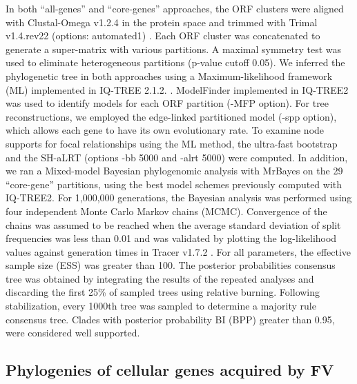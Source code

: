 In both “all-genes” and “core-genes” approaches, the ORF clusters were aligned with Clustal-Omega v1.2.4 \citep{sievers_fast_2011} in the protein space and trimmed with Trimal v1.4.rev22 (options: automated1) \citep{capella-gutierrez_trimal_2009}. Each ORF cluster was concatenated to generate a super-matrix with various partitions. A maximal symmetry test \citep{naser-khdour_prevalence_2019} was used to eliminate heterogeneous partitions (p-value cutoff 0.05). We inferred the phylogenetic tree in both approaches using a Maximum-likelihood framework (ML) implemented in IQ-TREE 2.1.2. \citep{minh_corrigendum_2020}. ModelFinder \citep{kalyaanamoorthy_modelfinder_2017} implemented in IQ-TREE2 was used to identify models for each ORF partition (-MFP option). For tree reconstructions, we employed the edge-linked partitioned model (-spp option), which allows each gene to have its own evolutionary rate. To examine node supports for focal relationships using the ML method, the ultra-fast bootstrap  \citep{hoang_ufboot2_2018} and the SH-aLRT (options -bb 5000 and -alrt 5000) were computed. In addition, we ran a Mixed-model Bayesian phylogenomic analysis with MrBayes \citep{ronquist_mrbayes_2012} on the 29 “core-gene” partitions, using the best model schemes previously computed with IQ-TREE2. For 1,000,000 generations, the Bayesian analysis was performed using four independent Monte Carlo Markov chains (MCMC). Convergence of the chains was assumed to be reached when the average standard deviation of split frequencies was less than 0.01 and was validated by plotting the log-likelihood values against generation times in Tracer v1.7.2 \citep{rambaut_posterior_2018}. For all parameters, the effective sample size (ESS) was greater than 100. The posterior probabilities consensus tree was obtained by integrating the results of the repeated analyses and discarding the first 25\% of sampled trees using relative burning. Following stabilization, every 1000th tree was sampled to determine a majority rule consensus tree. Clades with posterior probability BI (BPP) greater than 0.95, were considered well supported. 

\subsection{Phylogenies of cellular genes acquired by FV}


